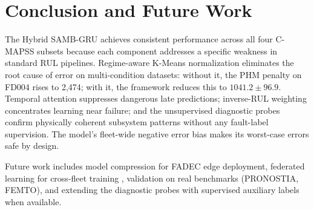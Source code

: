\documentclass[conference]{IEEEtran}
\begin{document}
\section{Conclusion and Future Work}

The Hybrid SAMB-GRU achieves consistent performance across all four C-MAPSS subsets because each component addresses a specific weakness in standard RUL pipelines. Regime-aware K-Means normalization eliminates the root cause of error on multi-condition datasets: without it, the PHM penalty on FD004 rises to 2,474; with it, the framework reduces this to $1041.2\pm 96.9$. Temporal attention suppresses dangerous late predictions; inverse-RUL weighting concentrates learning near failure; and the unsupervised diagnostic probes confirm physically coherent subsystem patterns without any fault-label supervision. The model's fleet-wide negative error bias makes its worst-case errors safe by design.

Future work includes model compression for FADEC edge deployment, federated learning for cross-fleet training \cite{b14}, validation on real benchmarks (PRONOSTIA, FEMTO), and extending the diagnostic probes with supervised auxiliary labels when available.
\end{document}
